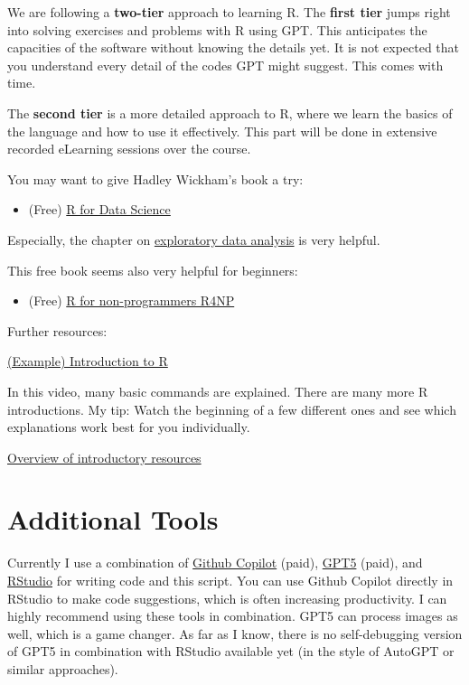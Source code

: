 \documentclass[
]{book}
\providecommand{\tightlist}{%
  \setlength{\itemsep}{0pt}\setlength{\parskip}{0pt}}
\begin{document}
We are following a \textbf{two-tier} approach to learning R. The \textbf{first tier} jumps right into solving
exercises and problems with R using GPT. This anticipates the capacities of the software
without knowing the details yet. It is not expected that you understand every detail of the codes
GPT might suggest. This comes with time.

The \textbf{second tier} is a more detailed approach to R,
where we learn the basics of the language and how to use it effectively. This part will be done
in extensive recorded eLearning sessions over the course.

You may want to give Hadley Wickham's book a try:

\begin{itemize}
\tightlist
\item
  (Free) \href{https://r4ds.had.co.nz/}{R for Data Science}
\end{itemize}

Especially, the chapter on \href{https://r4ds.hadley.nz/EDA.html}{exploratory data analysis} is very helpful.

This free book seems also very helpful for beginners:

\begin{itemize}
\tightlist
\item
  (Free) \href{https://bookdown.org/daniel_dauber_io/r4np_book/}{R for non-programmers R4NP}
\end{itemize}

Further resources:

\href{https://www.youtube.com/watch?v=_V8eKsto3Ug&t=140s}{(Example) Introduction to R}

In this video, many basic commands are explained. There are many more R introductions.
My tip: Watch the beginning of a few different ones and see which explanations work best for you individually.

\href{https://cran.r-project.org/other-docs.html}{Overview of introductory resources}

\section*{Additional Tools}\label{additional-tools}

Currently I use a combination of \href{https://github.com/features/copilot}{Github Copilot} (paid),
\href{https://chatgpt.com/}{GPT5} (paid), and \href{https://posit.co/download/rstudio-desktop/}{RStudio} for writing code and this script.
You can use Github Copilot directly in RStudio to make code suggestions, which is often increasing productivity.
I can highly recommend using these tools in combination. GPT5 can process images as well, which is a game changer.
As far as I know, there is no self-debugging version of GPT5 in combination with RStudio available yet
(in the style of AutoGPT or similar approaches).
\end{document}
